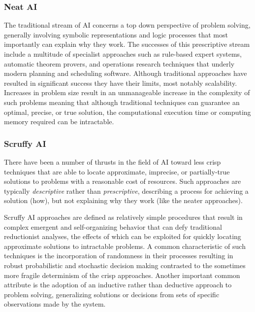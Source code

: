 \begin{bibunit}
\subsubsection{Neat AI}
The traditional stream of AI concerns a top down perspective of problem solving, generally involving symbolic representations and logic processes that most importantly can explain why they work. The successes of this prescriptive stream include a multitude of specialist approaches such as rule-based expert systems, automatic theorem provers, and operations research techniques that underly modern planning and scheduling software. Although traditional approaches have resulted in significant success they have their limits, most notably scalability. Increases in problem size result in an unmanageable increase in the complexity of such problems meaning that although traditional techniques can guarantee an optimal, precise, or true solution, the computational execution time or computing memory required can be intractable.

\subsubsection{Scruffy AI}
There have been a number of thrusts in the field of AI toward less crisp techniques that are able to locate approximate, imprecise, or partially-true solutions to problems with a reasonable cost of resources. Such approaches are typically \emph{descriptive} rather than \emph{prescriptive}, describing a process for achieving a solution (how), but not explaining why they work (like the neater approaches). 

Scruffy AI approaches are defined as relatively simple procedures that result in complex emergent and self-organizing behavior that can defy traditional reductionist analyses, the effects of which can be exploited for quickly locating approximate solutions to intractable problems. A common characteristic of such techniques is the incorporation of randomness in their processes resulting in robust probabilistic and stochastic decision making contrasted to the sometimes more fragile determinism of the crisp approaches. Another important common attribute is the adoption of an inductive rather than deductive approach to problem solving, generalizing solutions or decisions from sets of specific observations made by the system.

% 
% 

\end{bibunit}
